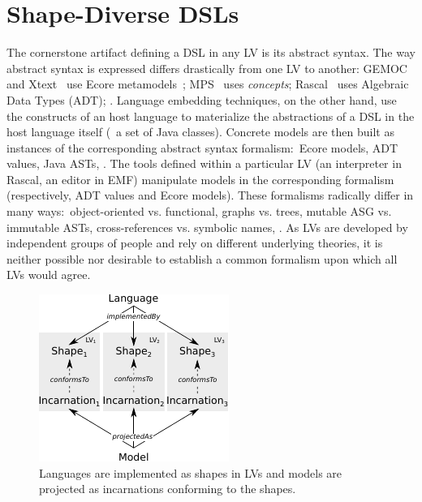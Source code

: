 \section{Shape-Diverse DSLs}
\label{sec:shapes}

The cornerstone artifact defining a DSL in any LV is its abstract syntax.
The way abstract syntax is expressed differs drastically from one LV to another: GEMOC~\cite{bousse2016execution} and Xtext~\cite{bettini2016implementing} use Ecore metamodels~\cite{steinberg2008emf}; MPS~\cite{voelter2014generic} uses \emph{concepts}; Rascal~\cite{klint2010easy} uses Algebraic Data Types (ADT); \etc.
Language embedding techniques, on the other hand, use the constructs of an host language to materialize the abstractions of a DSL in the host language itself (\eg~a set of Java classes).
Concrete models are then built as instances of the corresponding abstract syntax formalism:~Ecore models, ADT values, Java ASTs, \etc.
The tools defined within a particular LV (an interpreter in Rascal, an editor in EMF) manipulate models in the corresponding formalism (respectively, ADT values and Ecore models).
These formalisms radically differ in many ways:~object-oriented vs. functional, graphs vs. trees, mutable ASG vs. immutable ASTs, cross-references vs. symbolic names, \etc.
As LVs are developed by independent groups of people and rely on different underlying theories, it is neither possible nor desirable to establish a common formalism upon which all LVs would agree.

\begin{figure}[bt]
	\centering
	\includegraphics[width=.7\columnwidth]{figures/shape-diverse-lang-2}
	\caption{Languages are implemented as shapes in LVs and models are projected as incarnations conforming to the shapes.}
	\label{fig:concepts}
\end{figure}

